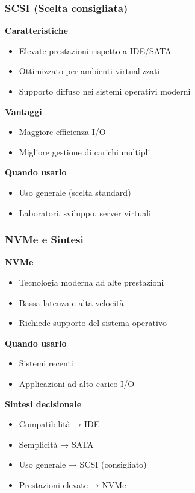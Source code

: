 \documentclass{beamer}
\begin{document}
	
	\begin{frame}
		\frametitle{SCSI (Scelta consigliata)}
		
		\textbf{Caratteristiche}
		\begin{itemize}
			\item Elevate prestazioni rispetto a IDE/SATA
			\item Ottimizzato per ambienti virtualizzati
			\item Supporto diffuso nei sistemi operativi moderni
		\end{itemize}
		
		\vspace{0.4cm}
		
		\textbf{Vantaggi}
		\begin{itemize}
			\item Maggiore efficienza I/O
			\item Migliore gestione di carichi multipli
		\end{itemize}
		
		\vspace{0.4cm}
		
		\textbf{Quando usarlo}
		\begin{itemize}
			\item Uso generale (scelta standard)
			\item Laboratori, sviluppo, server virtuali
		\end{itemize}
		
	\end{frame}
	
	
	\begin{frame}
		\frametitle{NVMe e Sintesi}
		
		\textbf{NVMe}
		\begin{itemize}
			\item Tecnologia moderna ad alte prestazioni
			\item Bassa latenza e alta velocità
			\item Richiede supporto del sistema operativo
		\end{itemize}
		
		\vspace{0.4cm}
		
		\textbf{Quando usarlo}
		\begin{itemize}
			\item Sistemi recenti
			\item Applicazioni ad alto carico I/O
		\end{itemize}
		
		\vspace{0.5cm}
		
		\textbf{Sintesi decisionale}
		\begin{itemize}
			\item Compatibilità → IDE
			\item Semplicità → SATA
			\item Uso generale → SCSI (consigliato)
			\item Prestazioni elevate → NVMe
		\end{itemize}
		
	\end{frame}
	
\end{document}
